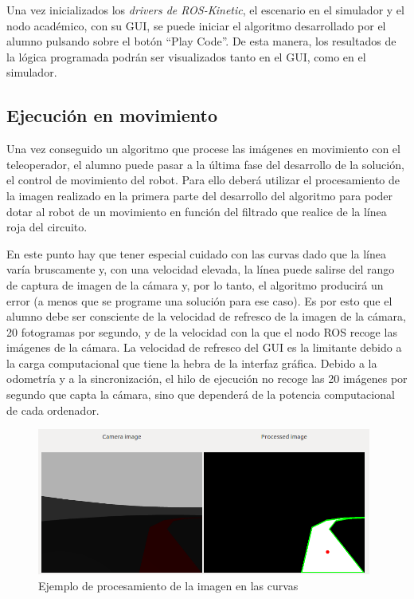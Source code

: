 Una vez inicializados los \textit{drivers de ROS-Kinetic}, el escenario en el simulador y el nodo académico, con su GUI, se puede iniciar el algoritmo desarrollado por el alumno pulsando sobre el botón ``Play Code''. De esta manera, los resultados de la lógica programada podrán ser visualizados tanto en el GUI, como en el simulador.
 
\subsection{Ejecución en movimiento}
Una vez conseguido un algoritmo que procese las imágenes en movimiento con el teleoperador, el alumno puede pasar a la última fase del desarrollo de la solución, el control de movimiento del robot. Para ello deberá utilizar el procesamiento de la imagen realizado en la primera parte del desarrollo del algoritmo para poder dotar al robot de un movimiento en función del filtrado que realice de la línea roja del circuito.

En este punto hay que tener especial cuidado con las curvas dado que la línea varía bruscamente y, con una velocidad elevada, la línea puede salirse del rango de captura de imagen de la cámara y, por lo tanto, el algoritmo producirá un error (a menos que se programe una solución para ese caso). Es por esto que el alumno debe ser consciente de la velocidad de refresco de la imagen de la cámara, 20 fotogramas por segundo, y de la velocidad con la que el nodo ROS recoge las imágenes de la cámara. La velocidad de refresco del GUI es la limitante debido a la carga computacional que tiene la hebra de la interfaz gráfica. Debido a la odometría y a la sincronización, el hilo de ejecución no recoge las 20 imágenes por segundo que capta la cámara, sino que dependerá de la potencia computacional de cada ordenador.

\begin{figure}[H]
  \begin{center}
    \includegraphics[width=0.98\textwidth]{figures/filtrado_curvas_chrono.png}
		\caption{Ejemplo de procesamiento de la imagen en las curvas}
		\label{fig.pdiecch}
		\end{center}
\end{figure}

